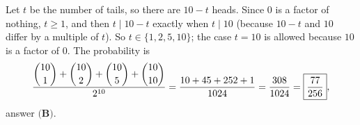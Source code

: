Let $t$ be the number of tails, so there are $10-t$ heads. Since $0$ is a factor of nothing, $t\ge1$, and then $t\mid 10-t$ exactly when $t\mid10$ (because $10-t$ and $10$ differ by a multiple of $t$). So $t\in\{1,2,5,10\}$; the case $t=10$ is allowed because $10$ is a factor of $0$. The probability is
\[\dfrac{\dbinom{10}{1}+\dbinom{10}{2}+\dbinom{10}{5}+\dbinom{10}{10}}{2^{10}}=\dfrac{10+45+252+1}{1024}=\dfrac{308}{1024}=\boxed{\dfrac{77}{256}},\]
answer $\textbf{(B)}$.

